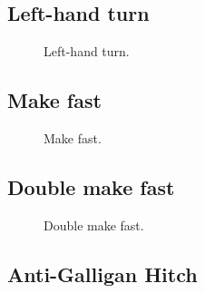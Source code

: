 \subsection{Left-hand turn}

\begin{figure}[H]\centering
	\begin{minipage}{1\linewidth}
		\begin{center}
			\tcbox[enhanced jigsaw,colframe=black,opacityframe=0.5,opacityback=0.5]
			{\centering{}}
		\end{center}
	\end{minipage}
\caption{Left-hand turn.}
\label{ris:left-hand_turn}
\end{figure}

\subsection{Make fast}


\begin{figure}[H]\centering
	\begin{minipage}{1\linewidth}
		\begin{center}
			\tcbox[enhanced jigsaw,colframe=black,opacityframe=0.5,opacityback=0.5]
			{\centering{}}
		\end{center}
	\end{minipage}
\caption{Make fast.}
\label{ris:Make_fast}
\end{figure}

\subsection{Double make fast}

\begin{figure}[H]\centering
	\begin{minipage}{1\linewidth}
		\begin{center}
			\tcbox[enhanced jigsaw,colframe=black,opacityframe=0.5,opacityback=0.5]
			{\centering{}}
		\end{center}
	\end{minipage}
\caption{Double make fast.}
\label{ris:Double_make_fast}
\end{figure}

\subsection{Anti-Galligan Hitch}

